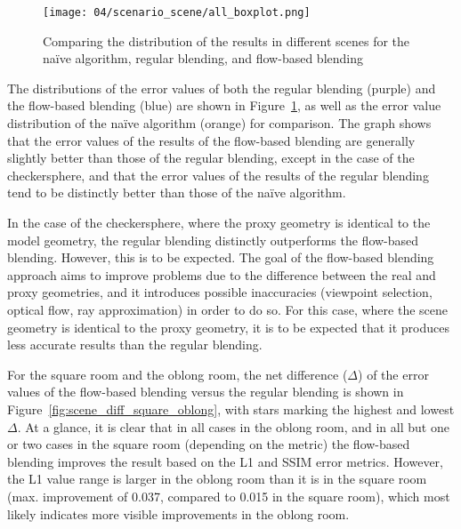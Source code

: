 \begin{figure}
		\centering
		\texttt{[image: 04/scenario\_scene/all\_boxplot.png]}
		\caption[The distribution of results in different scenes]{Comparing the distribution of the results in different scenes for the na\"ive algorithm, regular blending, and flow-based blending}
		\label{fig:scenario_scene_boxplot}
\end{figure}

The distributions of the error values of both the regular blending (purple) and the flow-based blending (blue) are shown in Figure~\ref{fig:scenario_scene_boxplot}, as well as the error value distribution of the na\"ive algorithm (orange) for comparison\footnotemark. The graph shows that the error values of the results of the flow-based blending are generally slightly better than those of the regular blending, except in the case of the checkersphere, and that the error values of the results of the regular blending tend to be distinctly better than those of the na\"ive algorithm. 

In the case of the checkersphere, where the proxy geometry is identical to the model geometry, the regular blending distinctly outperforms the flow-based blending. However, this is to be expected. The goal of the flow-based blending approach aims to improve problems due to the difference between the real and proxy geometries, and it introduces possible inaccuracies (viewpoint selection, optical flow, ray approximation) in order to do so. For this case, where the scene geometry is identical to the proxy geometry, it is to be expected that it produces less accurate results than the regular blending.

For the square room and the oblong room, the net difference ($\Delta$) of the error values of the flow-based blending versus the regular blending is shown in Figure~\ref{fig:scene_diff_square_oblong}, with stars marking the highest and lowest $\Delta$. At a glance, it is clear that in all cases in the oblong room, and in all but one or two cases in the square room (depending on the metric) the flow-based blending improves the result based on the L1 and SSIM error metrics. However, the L1 value range is larger in the oblong room than it is in the square room (max. improvement of 0.037, compared to 0.015 in the square room), which most likely indicates more visible improvements in the oblong room.

